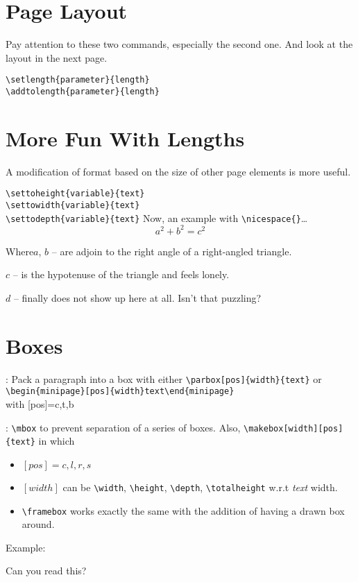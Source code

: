 \documentclass[a4paper,11pt]{article}
\begin{document}
\section{Page Layout}
Pay attention to these two commands, especially the second one.
And look at the layout in the next page.

\smallskip
\verb+\setlength{parameter}{length}+\\
\verb+\addtolength{parameter}{length}+
\layout

\section{More Fun With Lengths}
A modification of format based on the size of
other page elements is more useful.

\smallskip
\verb+\settoheight{variable}{text}+\\
\verb+\settowidth{variable}{text}+\\
\verb+\settodepth{variable}{text}+
\smallskip
\flushleft
Now, an example with \verb+\nicespace{}+\ldots
\begin{displaymath}
  a^2+b^2=c^2
\end{displaymath}

\begin{nicespace}{Where}$a$,
  $b$ -- are adjoin to the right angle
  of a right-angled triangle.

  $c$ -- is the hypotenuse of the triangle and
  feels lonely.

  $d$ -- finally does not show up here at all.
  Isn't that puzzling?
\end{nicespace}

\section{Boxes}
:
Pack a paragraph into a box with either
\verb+\parbox[pos]{width}{text}+ or\\
\verb+\begin{minipage}[pos]{width}text\end{minipage}+\\
with [pos]=c,t,b

: \verb+\mbox+ to prevent
separation of a series of boxes. Also,
\verb+\makebox[width][pos]{text}+ in which
\begin{itemize}
  \item $[pos]=c,l,r,s$
  \item $[width]$ can be \verb+\width+, \verb+\height+,
  \verb+\depth+, \verb+\totalheight+ w.r.t \emph{text}
  width.
  \item \verb+\framebox+ works exactly the same with
  the addition of having a drawn box around.
\end{itemize}
Example:
\par
{}\par
{}\par
{}\par
{}\par
{}
Can you read this?
\end{document}
